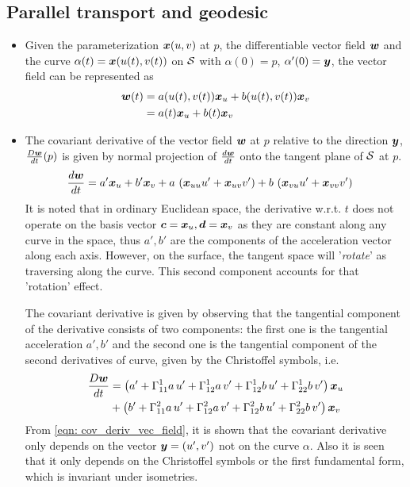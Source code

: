 \documentclass[11pt]{article}
\begin{document}
\subsection{Parallel transport and geodesic}
\begin{itemize}
\item Given the parameterization $\boldsymbol{x}(u,v)$ at $p$, the differentiable vector field $\boldsymbol{w}$ and the curve $\alpha(t) = \boldsymbol{x}(u(t), v(t))$ on ${\mathcal S}$ with $\alpha(0)=p$, $\alpha'(0)= \boldsymbol{y}$, the vector field can be represented as 
\begin{align}
\boldsymbol{w}(t) &= a(u(t), v(t))\boldsymbol{x}_{u} + b(u(t), v(t))\boldsymbol{x}_{v} \nonumber\\
&= a(t)\boldsymbol{x}_{u} + b(t)\boldsymbol{x}_{v} \label{eqn: diff_vec_field}
\end{align}

\item The covariant derivative of the vector field $\boldsymbol{w}$ at $p$ relative to the direction $\boldsymbol{y}$, $\frac{D\boldsymbol{w}}{dt}(p)$ is given by normal projection of $\frac{d\boldsymbol{w}}{dt}$ onto the tangent plane of ${\mathcal S}$ at $p$.
\begin{align*}
\frac{d\boldsymbol{w}}{dt} &=  a'\boldsymbol{x}_{u} + b'\boldsymbol{x}_{v} + a\,\left(\boldsymbol{x}_{uu}u'  + \boldsymbol{x}_{uv}v'\right) + b\,\left(\boldsymbol{x}_{vu}u'  + \boldsymbol{x}_{vv}v'\right)  
\end{align*}
It is noted that in ordinary Euclidean space, the derivative w.r.t. $t$ does not operate on the basis vector $\boldsymbol{c}=\boldsymbol{x}_{u}, \boldsymbol{d} = \boldsymbol{x}_{v}$ as they are constant along any curve in the space, thus $a', b'$ are the components of the acceleration vector along each axis. However, on the surface, the tangent space will '\emph{rotate}' as traversing along the curve. This second component accounts  for that 'rotation' effect. 

The covariant derivative is given by observing that the tangential component of the derivative consists of two components: the first one is the tangential acceleration $a', b'$ and the second one is the tangential component of the second derivatives of curve, given by the Christoffel symbols, i.e.
\begin{align}
\frac{D\boldsymbol{w}}{dt} &= \left(a' + \Gamma_{11}^{1}a\,u' + \Gamma_{12}^{1}a\,v' + \Gamma_{12}^{1}b\,u' +  \Gamma_{22}^{1}b\,v' \right) \boldsymbol{x}_{u} \nonumber\\
&+ \left(b' + \Gamma_{11}^{2}a\,u' + \Gamma_{12}^{2}a\,v' + \Gamma_{12}^{2}b\,u' +  \Gamma_{22}^{2}b\,v' \right) \boldsymbol{x}_{v}    \label{eqn: cov_deriv_vec_field}
\end{align} 
From \eqref{eqn: cov_deriv_vec_field}, it is shown that the covariant derivative only depends on the vector $\boldsymbol{y} = (u', v')$ not on the curve $\alpha$. Also it is seen that it only depends on the Christoffel symbols or the first fundamental form, which is invariant under isometries.  


\end{itemize}
\end{document}
